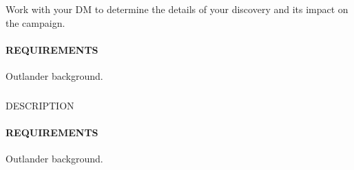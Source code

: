     Work with your DM to determine the details of your discovery and its impact on the campaign.
    \paragraph{REQUIREMENTS} Outlander background.

    \subsubsection{} \label{feat::NAME}
    DESCRIPTION
    \paragraph{REQUIREMENTS} Outlander background.




